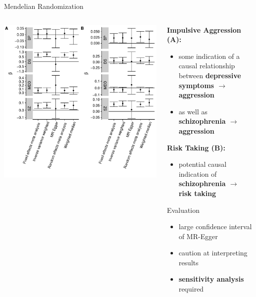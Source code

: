 \documentclass{beamer}
\begin{document}
\begin{frame}[t]{Mendelian Randomization}
  \tiny
  \begin{columns}[T]
    \begin{column}[T]{0.6\textwidth}
      \centering
      \includegraphics[width=0.99\linewidth]{../ukb_psychiatric/figures/overall_mr_effect.pdf}
    \end{column}
    \begin{column}[T]{0.5\textwidth}

      \textbf{Impulsive Aggression (A):}\\
      \begin{itemize}
        \item some indication of a causal relationship between \textbf{depressive symptoms $\rightarrow$ aggression } 
        \item as well as \textbf{schizophrenia $\rightarrow$ aggression}
      \end{itemize}

      \textbf{Risk Taking (B):}\\
      \begin{itemize}
        \item potential causal indication of \\ \textbf{schizophrenia $\rightarrow$ risk taking} 
      \end{itemize}

      \begin{block}{\tiny Evaluation}
        \begin{itemize}
          \item large confidence interval of MR-Egger
          \item caution at interpreting results
          \item \textbf{sensitivity analysis} required
        \end{itemize}
      \end{block} 
    \end{column}
  \end{columns}
\end{frame}
\end{document}
